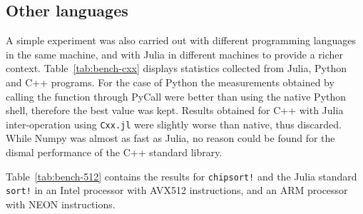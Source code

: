 \documentclass{juliacon}
\begin{document}
\subsection{Other languages}
A simple experiment was also carried out with different programming languages in the same machine, and with Julia in different machines to provide a richer context. Table~\ref{tab:bench-cxx} displays statistics collected from Julia, Python and C++ programs. For the case of Python the measurements obtained by calling the function through PyCall were better than using the native Python shell, therefore the best value was kept. Results obtained for C++ with Julia inter-operation using {\tt Cxx.jl} were slightly worse than native, thus discarded. While Numpy was almost as fast as Julia, no reason could be found for the dismal performance of the C++ standard library.

\begin{table}[h]
\label{tab:bench-cxx}
\end{table}

Table~\ref{tab:bench-512} contains the results for {\tt chipsort!} and the Julia standard {\tt sort!} in an Intel processor with AVX512 instructions, and an ARM processor with NEON instructions.
\begin{table}[h]
\label{tab:bench-512}
\end{table}
\end{document}
